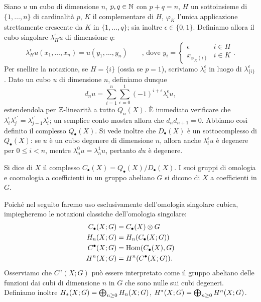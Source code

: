 Siano $u$ un cubo di dimensione $n$, $p,q\in\mathbb{N}$ con $p+q=n$, $H$ un sottoinsieme di $\{1,\ldots,n\}$ di cardinalità $p$, $K$ il complementare di $H$, $\varphi_K$ l'unica applicazione strettamente crescente da $K$ in $\{1,\ldots,q\}$; sia inoltre $\epsilon\in\{0,1\}$. Definiamo allora il cubo singolare $\lambda^\epsilon_Hu$ di dimensione $q$:
$$
\lambda^\epsilon_Hu(x_1,\ldots,x_n)=u(y_1,\ldots,y_n)\qquad\text{, dove }y_i=\begin{cases}\epsilon&i\in H\\x_{\varphi_K(i)}&i\in K\end{cases}.
$$
Per snellire la notazione, se $H=\{i\}$ (ossia se $p=1$), scriviamo $\lambda^\epsilon_i$ in luogo di $\lambda^\epsilon_{\{i\}}$. Dato un cubo $u$ di dimensione $n$, definiamo dunque
$$
d_nu=\sum_{i=1}^n\sum_{\epsilon=0}^1(-1)^{i+\epsilon}\lambda^\epsilon_iu,
$$
estendendola per $\mathbb{Z}$-linearità a tutto $Q_n(X)$. È immediato verificare che $\lambda^\epsilon_i\lambda^{\epsilon'}_j=\lambda^{\epsilon'}_{j-1}\lambda^\epsilon_i$; un semplice conto mostra allora che $d_nd_{n+1}=0$. Abbiamo così definito il complesso $Q_\bullet(X)$. Si vede inoltre che $D_\bullet(X)$ è un sottocomplesso di $Q_\bullet(X)$: se $u$ è un cubo degenere di dimensione $n$, allora anche $\lambda^\epsilon_iu$ è degenere per $0\le i<n$, mentre $\lambda^0_nu=\lambda^1_nu$, pertanto $du$ è degenere.
\begin{definition}
Si dice  di $X$ il complesso $C_\bullet(X)=Q_\bullet(X)/D_\bullet(X)$. I suoi gruppi di omologia e coomologia a coefficienti in un gruppo abeliano $G$ si dicono  di $X$ a coefficienti in $G$.
\end{definition}
Poiché nel seguito faremo uso esclusivamente dell'omologia singolare cubica, impiegheremo le notazioni classiche dell'omologia singolare: 
\begin{align*}
C_\bullet(X;G)&=C_\bullet(X)\mathbin{\otimes} G\\
H_n(X;G)&=H_n(C_\bullet(X;G))\\
C^\bullet(X;G)&=\operatorname{Hom}(C_\bullet(X),G)\\
H^n(X;G)&=H^n(C^\bullet(X;G)).
\end{align*}
Osserviamo che $C^n(X;G)$ può essere interpretato come il gruppo abeliano delle funzioni dai cubi di dimensione $n$ in $G$ che sono nulle sui cubi degeneri. Definiamo inoltre $H_*(X;G)=\bigoplus_{n\ge 0}H_n(X;G)$, $H^*(X;G)=\bigoplus_{n\ge 0}H^n(X;G)$.

